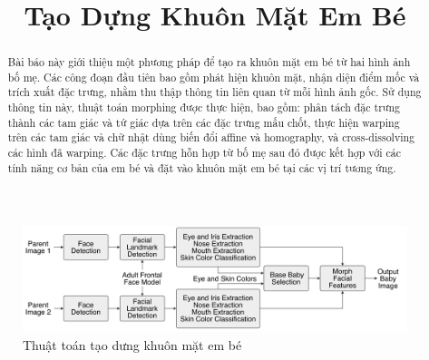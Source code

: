 \documentclass[conference]{IEEEtran}
\begin{document}
\title{Tạo Dựng Khuôn Mặt Em Bé}
\author{
\and
{}
}
\maketitle

\begin{center}
    \begin{figure}[!ht]
    \begin{center}
     \includegraphics[scale=1]{Images/44}
    \end{center}
    \caption{Thuật toán tạo dưng khuôn mặt em bé}
    \label{refhinh1}
    \end{figure}
\end{center}

\begin{abstract}

Bài báo này giới thiệu một phương pháp để tạo ra khuôn mặt em bé từ hai hình ảnh bố mẹ. Các công đoạn đầu tiên bao gồm phát hiện khuôn mặt, nhận diện điểm mốc và trích xuất đặc trưng, nhằm thu thập thông tin liên quan từ mỗi hình ảnh gốc. Sử dụng thông tin này, thuật toán morphing được thực hiện, bao gồm: phân tách đặc trưng thành các tam giác và tứ giác dựa trên các đặc trưng mấu chốt, thực hiện warping trên các tam giác và chữ nhật dùng biến đổi affine và homography, và cross-dissolving các hình đã warping. Các đặc trưng hỗn hợp từ bố mẹ sau đó được kết hợp với các tính năng cơ bản của em bé và đặt vào khuôn mặt em bé tại các vị trí tương ứng.

\end{abstract}

\IEEEpeerreviewmaketitle
\end{document}
